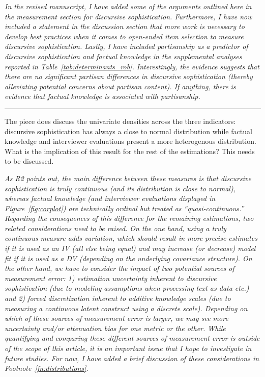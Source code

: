 \textit{In the revised manuscript, I have added some of the arguments outlined here in the measurement section for discursive sophistication. Furthermore, I have now included a statement in the discussion section that more work is necessary to develop best practices when it comes to open-ended item selection to measure discursive sophistication. Lastly, I have included partisanship as a predictor of discursive sophistication and factual knowledge in the supplemental analyses reported in Table~\ref{tab:determinants_rob}. Interestingly, the evidence suggests that there are no significant partisan differences in discursive sophistication (thereby alleviating potential concerns about partisan content). If anything, there is evidence that factual knowledge is associated with partisanship.}
	

\rule{\linewidth}{.01cm}

The piece does discuss the univariate densities across the three indicators: discursive sophistication has always a close to normal distribution while factual knowledge and interviewer evaluations present a more heterogenous distribution. What is the implication of this result for the rest of the estimations? This needs to be discussed.

\textit{As R2 points out, the main difference between these measures is that discursive sophistication is truly continuous (and its distribution is close to normal), whereas factual knowledge (and interviewer evaluations displayed in Figure~\ref{fig:corplot}) are technically ordinal but treated as ``quasi-continuous.'' Regarding the consequences of this difference for the remaining estimations, two related considerations need to be raised. On the one hand, using a truly continuous measure adds variation, which should result in more precise estimates if it is used as an IV (all else being equal) and may increase (or decrease) model fit if it is used as a DV (depending on the underlying covariance structure). On the other hand, we have to consider the impact of two potential sources of measurement error: 1) estimation uncertainty inherent to discursive sophistication (due to modeling assumptions when processing text as data etc.) and 2) forced discretization inherent to additive knowledge scales (due to measuring a continuous latent construct using a discrete scale). Depending on which of these sources of measurement error is larger, we may see more uncertainty and/or attenuation bias for one metric or the other. While quantifying and comparing these different sources of measurement error is outside of the scope of this article, it is an important issue that I hope to investigate in future studies. For now, I have added a brief discussion of these considerations in Footnote~\ref{fn:distributions}.}


